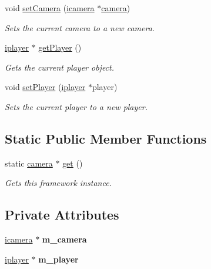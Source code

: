 \begin{DoxyCompactItemize}
void \hyperlink{classflounder_1_1camera_a43117513a5beffafb902448843206a79}{set\+Camera} (\hyperlink{classflounder_1_1icamera}{icamera} $\ast$\hyperlink{classflounder_1_1camera}{camera})
\begin{DoxyCompactList}\small\item\em Sets the current camera to a new camera. \end{DoxyCompactList}\item 
\hyperlink{classflounder_1_1iplayer}{iplayer} $\ast$ \hyperlink{classflounder_1_1camera_a662d47759c3b570def49a75981b95bc4}{get\+Player} ()
\begin{DoxyCompactList}\small\item\em Gets the current player object. \end{DoxyCompactList}\item 
void \hyperlink{classflounder_1_1camera_aa572fb3c1428b8a69aba9e9944405c5c}{set\+Player} (\hyperlink{classflounder_1_1iplayer}{iplayer} $\ast$player)
\begin{DoxyCompactList}\small\item\em Sets the current player to a new player. \end{DoxyCompactList}\end{DoxyCompactItemize}
\subsection*{Static Public Member Functions}
\begin{DoxyCompactItemize}
\item 
static \hyperlink{classflounder_1_1camera}{camera} $\ast$ \hyperlink{classflounder_1_1camera_a3ea117d355e4925fa5238bae5e6e46b1}{get} ()
\begin{DoxyCompactList}\small\item\em Gets this framework instance. \end{DoxyCompactList}\end{DoxyCompactItemize}
\subsection*{Private Attributes}
\begin{DoxyCompactItemize}
\item 
\mbox{\label{classflounder_1_1camera_a0fdfccdc761a7c057c431e2e1b1e9456}} 
\hyperlink{classflounder_1_1icamera}{icamera} $\ast$ {\bfseries m\+\_\+camera}
\item 
\mbox{\label{classflounder_1_1camera_a8dc046728d790d77234a25dca96ac649}} 
\hyperlink{classflounder_1_1iplayer}{iplayer} $\ast$ {\bfseries m\+\_\+player}
\end{DoxyCompactItemize}


